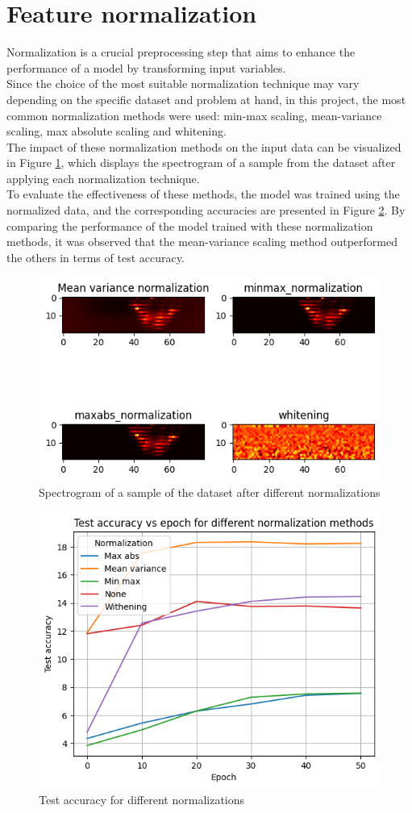 \documentclass{class}
\begin{document}
\section{Feature normalization}
Normalization is a crucial preprocessing step that aims to enhance the performance of a model by transforming input variables. \\
Since the choice of the most suitable normalization technique may vary depending on the specific dataset and problem at hand,
in this project, the most common normalization methods were used: min-max scaling, mean-variance scaling, max absolute scaling and whitening.\\
The impact of these normalization methods on the input data can be visualized in Figure \ref{fig-8}, which displays the spectrogram of a sample from the dataset after applying each normalization technique. \\
To evaluate the effectiveness of these methods, the model was trained using the normalized data, and the corresponding accuracies are presented in Figure \ref{fig-9}.
By comparing the performance of the model trained with these normalization methods, it was observed that the mean-variance scaling method outperformed the others in terms of test accuracy.
\begin{figure}[H]
    \centering
    \includegraphics[width=.8\columnwidth]{images/normalization_spectrogram.png}
    \caption{Spectrogram of a sample of the dataset after different normalizations}
    \label{fig-8}
\end{figure}

\begin{figure}[H]
    \centering
    \includegraphics[width=.8\columnwidth]{images/test_diff_normalizations.png}
    \caption{Test accuracy for different normalizations}
    \label{fig-9}
\end{figure}
\end{document}
